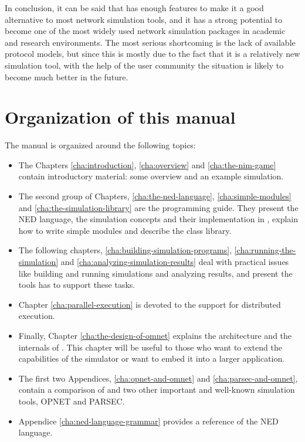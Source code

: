 In conclusion, it can be said that {\opp} has enough features
to make it a good alternative to most network simulation tools,
and it has a strong potential to become one of the most widely
used network simulation packages in academic and research environments.
The most serious shortcoming is the lack of available protocol
models, but since this is mostly due to the fact that it is a
relatively new simulation tool, with the help of the {\opp}
user community the situation is likely to become much better
in the future.





\section{Organization of this manual}

The manual is organized around the following topics:
\begin{itemize}
  \item{The Chapters \ref{cha:introduction}, \ref{cha:overview} and
    \ref{cha:the-nim-game} contain introductory material: some
    overview and an example simulation.}
  \item{The second group of Chapters, \ref{cha:the-ned-language},
    \ref{cha:simple-modules} and \ref{cha:the-simulation-library} are
    the programming guide. They present the NED language, the
    simulation concepts and their implementation in {\opp}, explain
    how to write simple modules and describe the class library.}
  \item{The following chapters,
    \ref{cha:building-simulation-programs},
    \ref{cha:running-the-simulation} and
    \ref{cha:analyzing-simulation-results} deal with practical issues
    like building and running simulations and analyzing results, and
    present the tools {\opp} has to support these tasks.}
  \item{Chapter \ref{cha:parallel-execution} is devoted to the support
    for distributed execution.}
  \item{Finally, Chapter \ref{cha:the-design-of-omnet} explains the
    architecture and the internals of {\opp}. This chapter will be
    useful to those who want to extend the capabilities of the
    simulator or want to embed it into a larger application.}
  \item{The first two Appendices, \ref{cha:opnet-and-omnet} and
    \ref{cha:parsec-and-omnet}, contain a comparison of {\opp} and
    two other important and well-known simulation tools, OPNET and
    PARSEC.}
  \item{Appendice \ref{cha:ned-language-grammar} provides a reference
    of the NED language.}
\end{itemize}




